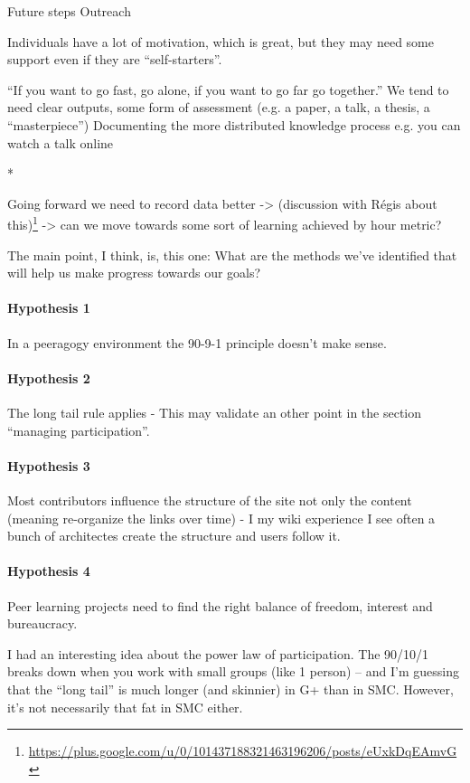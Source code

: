 \documentclass{acm_proc_article-sp}
\begin{document}
Future steps
Outreach

Individuals have a lot of motivation, which is great, but they may need some support even if they are ``self-starters''.

``If you want to go fast, go alone, if you want to go far go together.''
We tend to need clear outputs, some form of assessment (e.g. a paper,
a talk, a thesis, a ``masterpiece'')
Documenting the more distributed knowledge process
e.g. you can watch a talk online

\begin{center}
*
\end{center}

Going forward we need to record data better -> (discussion with
R\'egis about
this)\footnote{\url{https://plus.google.com/u/0/101437188321463196206/posts/eUxkDqEAmvG}}
-> can we move towards some sort of learning achieved by hour metric?

The main point, I think, is, this one: What are the methods we've
identified that will help us make progress towards our goals?

\paragraph{Hypothesis 1}
In a peeragogy environment the 90-9-1 principle doesn't make sense.

\paragraph{Hypothesis 2} The long tail rule applies - This may validate
an other point in the section ``managing participation''.

\paragraph{Hypothesis 3} Most contributors influence the structure of the site not only the content (meaning re-organize the links over time) - I my wiki experience I see often a bunch of architectes create the structure and users follow it.

\paragraph{Hypothesis 4} Peer learning projects need to find the right balance of freedom, interest and bureaucracy.

I had an interesting idea about the power law of participation. The 90/10/1 breaks down when you work with small groups (like 1 person) -- and I'm guessing that the ``long tail'' is much longer (and skinnier) in G+ than in SMC. However, it's not necessarily that fat in SMC either.
\end{document}

